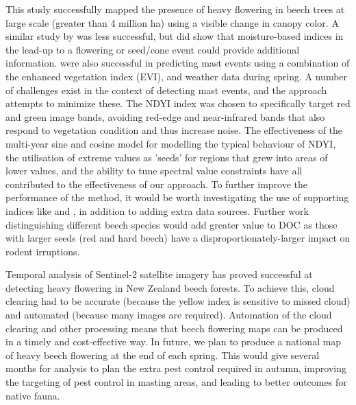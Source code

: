 \documentclass[remotesensing,article,submit,moreauthors,pdftex]{Definitions/mdpi}
\begin{document}
This study successfully mapped the presence of heavy flowering in beech trees at large scale (greater than 4 million ha) using a visible change in canopy color. A similar study by \citet{Garcia2021} was less successful, but did show that moisture-based indices in the lead-up to a flowering or seed/cone event could provide additional information. \citet{Marcos2015} were also successful in predicting mast events using a combination of the enhanced vegetation index (EVI), and weather data during spring. A number of challenges exist in the context of detecting mast events, and the \dndyi{} approach attempts to minimize these. The NDYI index was chosen to specifically target red and green image bands, avoiding red-edge and near-infrared bands that also respond to vegetation condition and thus increase noise. The effectiveness of the multi-year sine and cosine model for modelling the typical behaviour of NDYI, the utilisation of extreme \dndyi{} values as 'seeds' for regions that grew into areas of lower \dndyi{} values, and the ability to tune spectral value constraints have all contributed to the effectiveness of our approach. To further improve the performance of the \dndyi{} method, it would be worth investigating the use of supporting indices like \citet{Garcia2021} and \citet{Marcos2015}, in addition to adding extra data sources. Further work distinguishing different beech species would add greater value to DOC as those with larger seeds (red and hard beech) have a disproportionately-larger impact on rodent irruptions.

Temporal analysis of Sentinel-2 satellite imagery has proved successful at detecting heavy flowering in New Zealand beech forests. To achieve this, cloud clearing had to be accurate (because the yellow index is sensitive to missed cloud) and automated (because many images are required). Automation of the cloud clearing \citep{Shepherd2020} and other processing means that beech flowering maps can be produced in a timely and cost-effective way. In future, we plan to produce a national map of heavy beech flowering at the end of each spring. This would give several months for analysis to plan the extra pest control required in autumn, improving the targeting of pest control in masting areas, and leading to better outcomes for native fauna.


\end{document}
